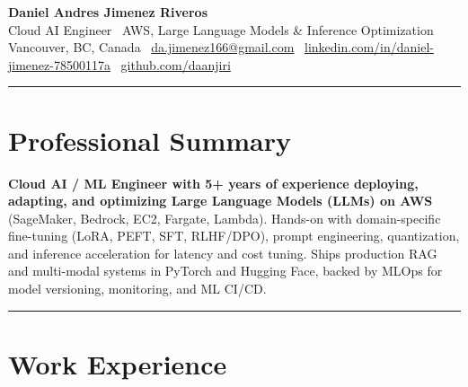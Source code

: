 \documentclass[9pt,a4paper]{extarticle}
\begin{document}
\titlespacing*{\subsection}{0pt}{3pt}{0pt}
\titlespacing*{\section}{0pt}{0pt}{2pt}


\pagestyle{empty}

{
\centering
{\LARGE\textbf{Daniel Andres Jimenez Riveros}}\\
Cloud AI Engineer \textbar\ AWS, Large Language Models \& Inference Optimization\\
Vancouver, BC, Canada \textbar\ \href{mailto:da.jimenez166@gmail.com}{da.jimenez166@gmail.com} \textbar\ \href{https://www.linkedin.com/in/daniel-jimenez-78500117a/}{linkedin.com/in/daniel-jimenez-78500117a} \textbar\ \href{https://github.com/daanjiri}{github.com/daanjiri}\\
}

\rule{\textwidth}{0.4pt}

\section*{Professional Summary}

\textbf{Cloud AI / ML Engineer with 5+ years of experience deploying, adapting, and optimizing Large Language Models (LLMs) on AWS} (SageMaker, Bedrock, EC2, Fargate, Lambda). Hands-on with domain-specific fine-tuning (LoRA, PEFT, SFT, RLHF/DPO), prompt engineering, quantization, and inference acceleration for latency and cost tuning. Ships production RAG and multi-modal systems in PyTorch and Hugging Face, backed by MLOps for model versioning, monitoring, and ML CI/CD.

\rule{\textwidth}{0.4pt}

\section*{Work Experience}
\end{document}
